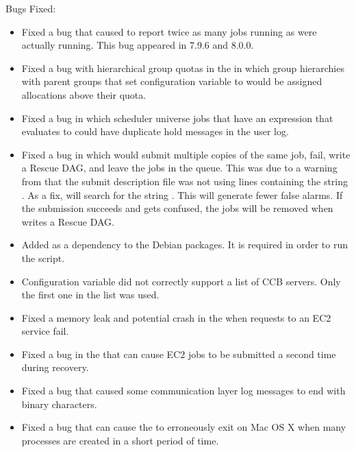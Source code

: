 \noindent Bugs Fixed:

\begin{itemize}

\item Fixed a bug that caused   to report twice
as many jobs running as were actually running. This bug appeared in 7.9.6 and
8.0.0.

\item Fixed a bug with hierarchical group quotas in the 
in which group hierarchies with parent groups that set 
configuration variable  to
 would be assigned allocations above their quota.

\item Fixed a bug in which scheduler universe jobs that
have an 
expression that evaluates to  could have duplicate hold messages
in the user log.

\item Fixed a bug in which  would submit multiple copies of the
same job, fail, write a Rescue DAG, and leave the jobs in the queue. 
This was due to a warning from  that the submit description file
was not using lines containing the string . 
As a fix,  will search for the
string .
This will generate fewer false alarms. 
If the submission succeeds and  gets confused, 
the jobs will be removed when  writes a Rescue DAG.

\item Added  as a dependency to the Debian packages.
It is required in order to run the  script.

\item Configuration variable  did not correctly 
support a list of CCB servers.  Only the first one in the list was used.

\item Fixed a memory leak and potential crash in the 
when requests to an EC2 service fail.

\item Fixed a bug in the  that can cause EC2 jobs to be
submitted a second time during recovery.

\item Fixed a bug that caused some communication layer log messages 
to end with binary characters.

\item Fixed a bug that can cause the  to erroneously exit
on Mac OS X when many processes are created in a short period of time.

\end{itemize}

